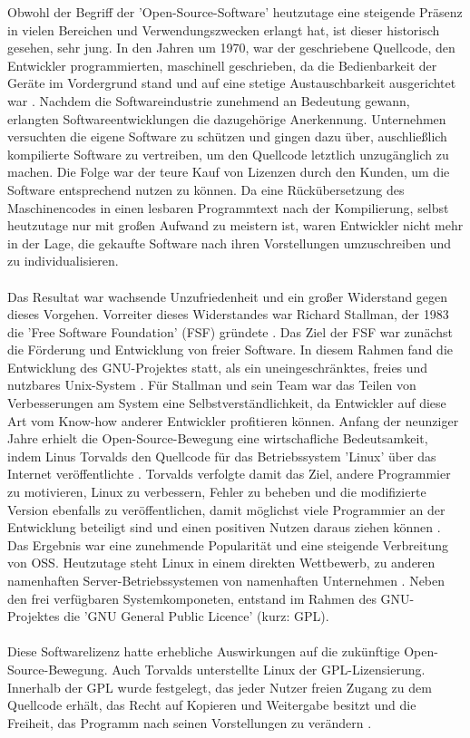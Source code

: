 Obwohl der Begriff der 'Open-Source-Software' heutzutage eine steigende Präsenz in vielen Bereichen und Verwendungszwecken erlangt hat, ist dieser historisch gesehen, sehr jung. In den Jahren um 1970, war der geschriebene Quellcode, den Entwickler programmierten, maschinell geschrieben, da die Bedienbarkeit der Geräte im Vordergrund stand und auf eine stetige Austauschbarkeit ausgerichtet war \cite[S. 258]{buxmann_softwareindustrie_2015}. Nachdem die Softwareindustrie zunehmend an Bedeutung gewann, erlangten Softwareentwicklungen die dazugehörige Anerkennung. Unternehmen versuchten die eigene Software zu schützen und gingen dazu über, auschließlich kompilierte Software zu vertreiben, um den Quellcode letztlich unzugänglich zu machen. Die Folge war der teure Kauf von Lizenzen durch den Kunden, um die Software entsprechend nutzen zu können. Da eine Rückübersetzung des Maschinencodes in einen lesbaren Programmtext nach der Kompilierung, selbst heutzutage nur mit großen Aufwand zu meistern ist, \cite[S. 8/9]{raymond_cathedral_2001} waren Entwickler nicht mehr in der Lage, die gekaufte Software nach ihren Vorstellungen umzuschreiben und zu individualisieren.\\\\ Das Resultat war wachsende Unzufriedenheit und ein großer Widerstand gegen dieses Vorgehen. Vorreiter dieses Widerstandes war Richard Stallman, der 1983 die 'Free Software Foundation' (FSF) gründete \cite{batarseh_history_2020}. Das Ziel der FSF war zunächst die Förderung und Entwicklung von freier Software. In diesem Rahmen fand die Entwicklung des GNU-Projektes statt, als ein uneingeschränktes, freies und nutzbares Unix-System \cite{fsf_uber_3021}. Für Stallman und sein Team war das Teilen von Verbesserungen am System eine Selbstverständlichkeit, da Entwickler auf diese Art vom Know-how anderer Entwickler profitieren können. Anfang der neunziger Jahre erhielt die Open-Source-Bewegung eine wirtschafliche Bedeutsamkeit, indem Linus Torvalds den Quellcode für das Betriebssystem 'Linux' über das Internet veröffentlichte \cite[S. 9]{wichmann_linux-_2005}. Torvalds verfolgte damit das Ziel, andere Programmier zu motivieren, Linux zu verbessern, Fehler zu beheben und die modifizierte Version ebenfalls zu veröffentlichen, damit möglichst viele Programmier an der Entwicklung beteiligt sind und einen positiven Nutzen daraus ziehen können \cite[S. 16]{kesler_anpassung_2013}. Das Ergebnis war eine zunehmende Popularität und eine steigende Verbreitung von OSS. Heutzutage steht Linux in einem direkten Wettbewerb, zu anderen namenhaften Server-Betriebssystemen von namenhaften Unternehmen \cite{schumacher_microsoft_2016}. Neben den frei verfügbaren Systemkomponeten, entstand im Rahmen des GNU-Projektes die 'GNU General Public Licence' (kurz: GPL).\\\\ Diese Softwarelizenz hatte erhebliche Auswirkungen auf die zukünftige Open-Source-Bewegung. Auch Torvalds unterstellte Linux der GPL-Lizensierung. Innerhalb der GPL wurde festgelegt, das jeder Nutzer freien Zugang zu dem Quellcode erhält, das Recht auf Kopieren und Weitergabe besitzt und die Freiheit, das Programm nach seinen Vorstellungen zu verändern \cite{fsf_gnu-manifest_2016}. 
